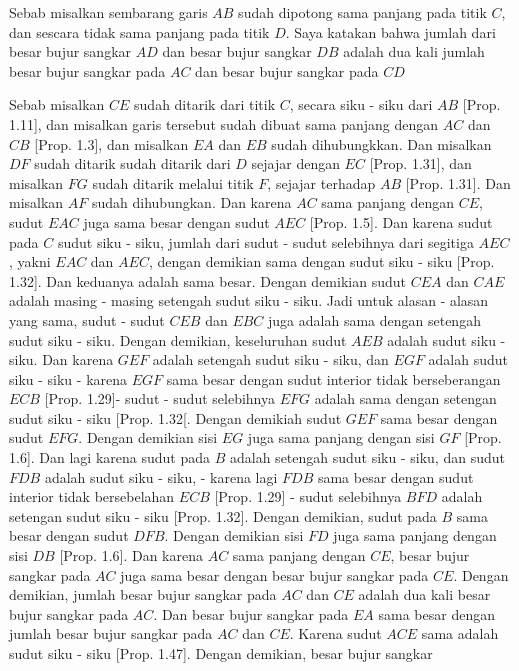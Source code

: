 \documentclass[a4paper]{book}
\begin{document}
Sebab misalkan sembarang garis $AB$ sudah dipotong sama panjang pada titik $C$,
dan sescara tidak sama panjang pada titik $D$. Saya katakan bahwa jumlah dari
besar bujur sangkar $AD$ dan besar bujur sangkar $DB$ adalah dua kali jumlah
besar bujur sangkar pada $AC$ dan besar bujur sangkar pada $CD$

Sebab misalkan $CE$ sudah ditarik dari titik $C$, secara siku - siku dari $AB$
[Prop. 1.11], dan misalkan garis tersebut sudah dibuat sama panjang dengan $AC$ 
dan $CB$ [Prop. 1.3], dan misalkan $EA$ dan $EB$ sudah dihubungkkan. Dan misalkan
$DF$ sudah ditarik sudah ditarik dari $D$ sejajar dengan $EC$ [Prop. 1.31], dan
misalkan $FG$ sudah ditarik melalui titik $F$, sejajar terhadap $AB$ [Prop. 1.31].
Dan misalkan $AF$ sudah dihubungkan. Dan karena $AC$ sama panjang dengan $CE$, 
sudut $EAC$ juga sama besar dengan sudut $AEC$ [Prop. 1.5]. Dan karena sudut 
pada $C$ sudut siku - siku, jumlah dari sudut - sudut selebihnya dari segitiga
$AEC$, yakni $EAC$ dan $AEC$, dengan demikian sama dengan sudut siku - siku
[Prop. 1.32]. Dan keduanya adalah sama besar. Dengan demikian sudut $CEA$ dan 
$CAE$ adalah masing - masing setengah sudut siku - siku. Jadi untuk alasan - 
alasan yang sama, sudut - sudut $CEB$ dan $EBC$ juga adalah sama dengan setengah
sudut siku - siku. Dengan demikian, keseluruhan sudut $AEB$ adalah sudut
siku - siku. Dan karena $GEF$ adalah setengah sudut siku - siku, dan $EGF$ 
adalah sudut  siku - siku - karena $EGF$ sama besar dengan sudut interior tidak
berseberangan $ECB$ [Prop. 1.29]- sudut - sudut selebihnya $EFG$ adalah sama
dengan setengan sudut siku - siku [Prop. 1.32[. Dengan demikiah sudut $GEF$
sama besar dengan sudut $EFG$. Dengan demikian sisi $EG$ juga sama panjang dengan
sisi $GF$ [Prop. 1.6]. Dan lagi karena sudut pada $B$ adalah setengah sudut
siku - siku, dan sudut $FDB$ adalah sudut siku - siku, - karena lagi $FDB$ 
sama besar dengan sudut interior tidak bersebelahan $ECB$ [Prop. 1.29] - sudut
selebihnya $BFD$ adalah setengan sudut siku - siku [Prop. 1.32]. Dengan demikian, sudut pada
$B$ sama besar dengan sudut $DFB$. Dengan demikian sisi $FD$ juga sama panjang 
dengan sisi $DB$ [Prop. 1.6]. Dan karena $AC$ sama panjang dengan $CE$, 
besar bujur sangkar pada $AC$ juga sama besar dengan besar bujur sangkar pada
$CE$. Dengan demikian, jumlah besar bujur sangkar pada $AC$ dan $CE$ adalah
dua kali besar bujur sangkar pada $AC$. Dan besar bujur sangkar pada $EA$ sama
besar dengan jumlah besar bujur sangkar pada $AC$ dan $CE$. Karena sudut $ACE$
sama adalah sudut siku - siku [Prop. 1.47]. Dengan demikian, besar bujur sangkar
\end{document}
